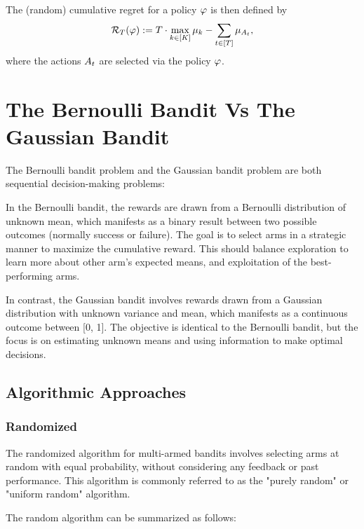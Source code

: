 The (random) cumulative regret for a policy $\varphi$ is then defined by
\begin{align*}
\mathcal{R}_{T}(\varphi):=T \cdot \max_{k \in [K]} \mu_{k}-\sum_{t \in [T]}\mu_{A_{t}},
\end{align*}
where the actions $A_{t}$ are selected via the policy $\varphi$.


\section{The Bernoulli Bandit Vs The Gaussian Bandit}
\label{sec:BernoulliBandit}

The Bernoulli bandit problem and the Gaussian bandit problem are both sequential decision-making problems:

In the Bernoulli bandit, the rewards are drawn from a Bernoulli distribution of unknown mean, which manifests as a binary result between two possible outcomes (normally success or failure). The goal is to select arms in a strategic manner to maximize the cumulative reward. This should balance exploration to learn more about other arm's expected means, and exploitation of the best-performing arms.

In contrast, the Gaussian bandit involves rewards drawn from a Gaussian distribution with unknown variance and mean, which manifests as a continuous outcome between [0, 1]. The objective is identical to the Bernoulli bandit, but the focus is on estimating unknown means and using information to make optimal decisions.

\subsection{Algorithmic Approaches}
\label{sec:Algorithms}

\subsubsection{Randomized}
\label{sec:randomized}
The randomized algorithm for multi-armed bandits involves selecting arms at random with equal probability, without considering any feedback or past performance. This algorithm is commonly referred to as the "purely random" or "uniform random" algorithm.

The random algorithm can be summarized as follows:



